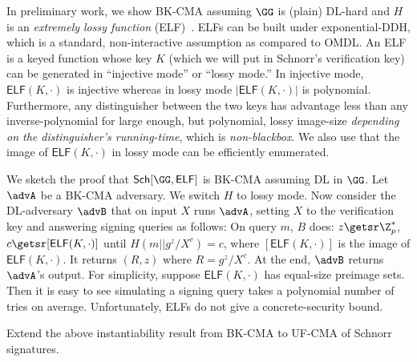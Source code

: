 In preliminary work, we show BK-CMA assuming $\GG$ is (plain) DL-hard and $H$ is an \emph{extremely lossy function} (ELF)~\cite{C:Zhandry16}.  ELFs can be built under exponential-DDH, which is a standard, non-interactive assumption as compared to OMDL. An ELF is a keyed function whose key $K$ (which we will put in Schnorr's verification key) can be generated in ``injective mode'' or ``lossy mode.''  In injective mode, $\mathsf{ELF}(K,\cdot)$ is injective whereas in lossy mode $|\mathsf{ELF}(K,\cdot)|$ is polynomial.  Furthermore, any distinguisher between the two  keys has advantage less  than any inverse-polynomial for large enough,  but polynomial, lossy image-size \emph{depending on the distinguisher's running-time}, which is  \emph{non-blackbox}.  We also use that the image of $\mathsf{ELF}(K,\cdot)$ in lossy mode can be efficiently enumerated.

We sketch the proof that $\mathsf{Sch}[\GG,\mathsf{ELF}]$ is BK-CMA assuming DL in $\GG$.  Let  $\advA$ be a BK-CMA adversary. We  switch $H$ to lossy mode.  Now consider the DL-adversary $\advB$ that on input $X$ runs $\advA$, setting $X$ to the verification key and answering signing queries as follows: On query $m$, $B$ does: $z \getsr \Z_p^*$, $c \getsr [\mathsf{ELF}(K,\cdot)]$ until $H(m || g^z/X^c) = c$, where $[\mathsf{ELF}(K,\cdot)]$ is the image of $\mathsf{ELF}(K,\cdot)$. It returns $(R,z)$ where $R = g^z/X^c$. At the end, $\advB$ returns $\advA$'s output. For simplicity, suppose $\mathsf{ELF}(K,\cdot)$ has equal-size preimage sets.   Then it is easy to see simulating a signing query takes a polynomial number of tries on average. Unfortunately, ELFs do not give a concrete-security bound. %

\begin{task} \label{task-inst}
    Extend the above instantiability result  from BK-CMA to UF-CMA of Schnorr signatures.
\end{task}



